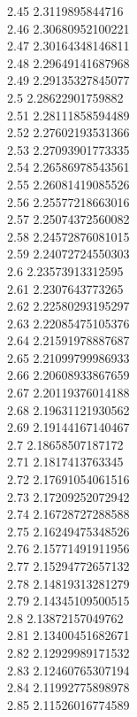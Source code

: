 {2.45	2.3119895844716\\
2.46	2.30680952100221\\
2.47	2.30164348146811\\
2.48	2.29649141687968\\
2.49	2.29135327845077\\
2.5	2.28622901759882\\
2.51	2.28111858594489\\
2.52	2.27602193531366\\
2.53	2.27093901773335\\
2.54	2.26586978543561\\
2.55	2.26081419085526\\
2.56	2.25577218663016\\
2.57	2.25074372560082\\
2.58	2.24572876081015\\
2.59	2.24072724550303\\
2.6	2.23573913312595\\
2.61	2.2307643773265\\
2.62	2.22580293195297\\
2.63	2.22085475105376\\
2.64	2.21591978887687\\
2.65	2.21099799986933\\
2.66	2.20608933867659\\
2.67	2.20119376014188\\
2.68	2.19631121930562\\
2.69	2.19144167140467\\
2.7	2.18658507187172\\
2.71	2.1817413763345\\
2.72	2.17691054061516\\
2.73	2.17209252072942\\
2.74	2.16728727288588\\
2.75	2.16249475348526\\
2.76	2.15771491911956\\
2.77	2.15294772657132\\
2.78	2.14819313281279\\
2.79	2.14345109500515\\
2.8	2.13872157049762\\
2.81	2.13400451682671\\
2.82	2.12929989171532\\
2.83	2.12460765307194\\
2.84	2.11992775898978\\
2.85	2.11526016774589\\
}
